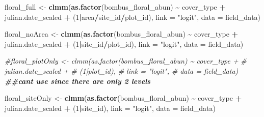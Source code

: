 \documentclass[
]{article}
\newenvironment{Shaded}{\begin{snugshade}}{\end{snugshade}}
\newcommand{\AttributeTok}[1]{\textcolor[rgb]{0.13,0.29,0.53}{#1}}
\newcommand{\CommentTok}[1]{\textcolor[rgb]{0.56,0.35,0.01}{\textit{#1}}}
\newcommand{\DecValTok}[1]{\textcolor[rgb]{0.00,0.00,0.81}{#1}}
\newcommand{\DocumentationTok}[1]{\textcolor[rgb]{0.56,0.35,0.01}{\textbf{\textit{#1}}}}
\newcommand{\FunctionTok}[1]{\textcolor[rgb]{0.13,0.29,0.53}{\textbf{#1}}}
\newcommand{\NormalTok}[1]{#1}
\newcommand{\OtherTok}[1]{\textcolor[rgb]{0.56,0.35,0.01}{#1}}
\newcommand{\SpecialCharTok}[1]{\textcolor[rgb]{0.81,0.36,0.00}{\textbf{#1}}}
\newcommand{\StringTok}[1]{\textcolor[rgb]{0.31,0.60,0.02}{#1}}
\begin{document}
\begin{Shaded}
\begin{Highlighting}[]
\NormalTok{floral\_full }\OtherTok{\textless{}{-}} \FunctionTok{clmm}\NormalTok{(}\FunctionTok{as.factor}\NormalTok{(bombus\_floral\_abun) }\SpecialCharTok{\textasciitilde{}}\NormalTok{ cover\_type }\SpecialCharTok{+}
\NormalTok{                         julian.date\_scaled }\SpecialCharTok{+} 
\NormalTok{                         (}\DecValTok{1}\SpecialCharTok{|}\NormalTok{area}\SpecialCharTok{/}\NormalTok{site\_id}\SpecialCharTok{/}\NormalTok{plot\_id),}
                       \AttributeTok{link =} \StringTok{"logit"}\NormalTok{, }
                       \AttributeTok{data =}\NormalTok{ field\_data)}

\NormalTok{floral\_noArea }\OtherTok{\textless{}{-}} \FunctionTok{clmm}\NormalTok{(}\FunctionTok{as.factor}\NormalTok{(bombus\_floral\_abun) }\SpecialCharTok{\textasciitilde{}}\NormalTok{ cover\_type }\SpecialCharTok{+}
\NormalTok{                         julian.date\_scaled }\SpecialCharTok{+} 
\NormalTok{                         (}\DecValTok{1}\SpecialCharTok{|}\NormalTok{site\_id}\SpecialCharTok{/}\NormalTok{plot\_id),}
                       \AttributeTok{link =} \StringTok{"logit"}\NormalTok{, }
                       \AttributeTok{data =}\NormalTok{ field\_data)}

\CommentTok{\#floral\_plotOnly \textless{}{-} clmm(as.factor(bombus\_floral\_abun) \textasciitilde{} cover\_type +}
 \CommentTok{\#                        julian.date\_scaled + }
  \CommentTok{\#                       (1|plot\_id),}
   \CommentTok{\#                    link = "logit", }
    \CommentTok{\#                   data = field\_data)}
\DocumentationTok{\#\#can\textquotesingle{}t use since there are only 2 levels}

\NormalTok{floral\_siteOnly }\OtherTok{\textless{}{-}} \FunctionTok{clmm}\NormalTok{(}\FunctionTok{as.factor}\NormalTok{(bombus\_floral\_abun) }\SpecialCharTok{\textasciitilde{}}\NormalTok{ cover\_type }\SpecialCharTok{+}
\NormalTok{                         julian.date\_scaled }\SpecialCharTok{+} 
\NormalTok{                         (}\DecValTok{1}\SpecialCharTok{|}\NormalTok{site\_id),}
                       \AttributeTok{link =} \StringTok{"logit"}\NormalTok{, }
                       \AttributeTok{data =}\NormalTok{ field\_data)}


\end{Highlighting}
\end{Shaded}
\end{document}
